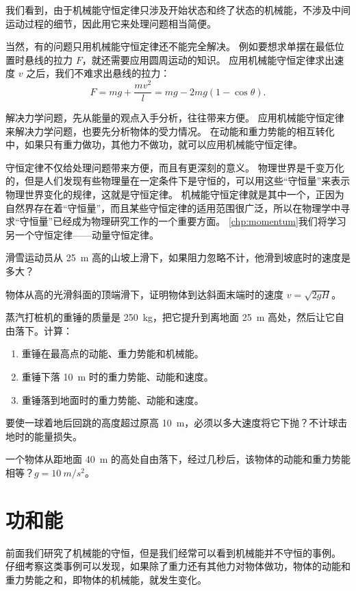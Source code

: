 我们看到，由于机械能守恒定律只涉及开始状态和终了状态的机械能，不涉及中间运动过程的细节，因此用它来处理问题相当简便。

当然，有的问题只用机械能守恒定律还不能完全解决。
例如要想求单摆在最低位置时悬线的拉力 $F$，就还需要应用圆周运动的知识。
应用机械能守恒定律求出速度 $v$ 之后，我们不难求出悬线的拉力：
\[F=mg+\frac{mv^2}{l}=mg-2mg (1-\cos\theta).\]

解决力学问题，先从能量的观点入手分析，往往带来方便。
应用机械能守恒定律来解决力学问题，也要先分析物体的受力情况。
在动能和重力势能的相互转化中，如果只有重力做功，其他力不做功，就可以应用机械能守恒定律。

守恒定律不仅给处理问题带来方便，而且有更深刻的意义。
物理世界是千变万化的，但是人们发现有些物理量在一定条件下是守恒的，可以用这些“守恒量”来表示物理世界变化的规律，这就是守恒定律。
机械能守恒定律就是其中一个，正因为自然界存在着“守恒量”，而且某些守恒定律的适用范围很广泛，所以在物理学中寻求“守恒量”已经成为物理研究工作的一个重要方面。
\cref{chp:momentum}我们将学习另一个守恒定律——动量守恒定律。

\begin{Practice}
\begin{question}
  \item 滑雪运动员从 \qty{25}{m} 高的山坡上滑下，如果阻力忽略不计，他滑到坡底时的速度是多大？
  \item 物体从高的光滑斜面的顶端滑下，证明物体到达斜面末端时的速度 $v=\sqrt{2gH}$。
  \item 蒸汽打桩机的重锤的质量是 \qty{250}{kg}，把它提升到离地面 \qty{25}{m} 高处，然后让它自由落下。计算：
  \begin{enumerate}
    \item 重锤在最高点的动能、重力势能和机械能。
    \item 重锤下落 \qty{10}{m} 时的重力势能、动能和速度。
    \item 重锤落到地面时的重力势能、动能和速度。
  \end{enumerate}
  \item 要使一球着地后回跳的高度超过原高 \qty{10}{m}，必须以多大速度将它下抛？不计球击地时的能量损失。
  \item 一个物体从距地面 \qty{40}{m} 的高处自由落下，经过几秒后，该物体的动能和重力势能相等？$g=\qty{10}{m/s^2}$。
\end{question}
\end{Practice}

\section{功和能}
前面我们研究了机械能的守恒，但是我们经常可以看到机械能并不守恒的事例。
仔细考察这类事例可以发现，如果除了重力还有其他力对物体做功，物体的动能和重力势能之和，即物体的机械能，就发生变化。

